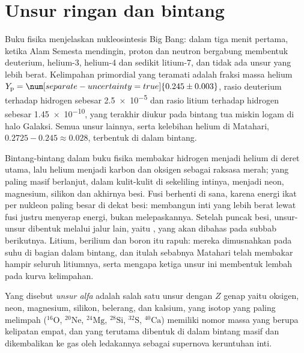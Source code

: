 \section{Unsur ringan dan bintang}\label{sec:b3:origin-of-elements:stars}

Buku fisika menjelaskan nukleosintesis Big Bang: dalam tiga menit pertama,
ketika Alam Semesta mendingin, proton dan neutron bergabung membentuk
deuterium, helium-3, helium-4 dan sedikit litium-7, dan tidak ada
unsur yang lebih berat. Kelimpahan primordial yang teramati adalah fraksi massa
helium $Y_\mathrm{p} = \num[separate-uncertainty=true]{0.245 \pm 0.003}$,
rasio deuterium terhadap hidrogen sebesar \num{2.5e-5} dan
rasio litium terhadap hidrogen sebesar \num{1.45e-10}, yang terakhir diukur pada bintang
tua miskin logam di halo Galaksi. Semua unsur lainnya, serta kelebihan helium
di Matahari, $0.2725 - 0.245 \approx 0.028$, terbentuk di dalam bintang.

Bintang-bintang dalam buku fisika membakar hidrogen menjadi helium di deret
utama, lalu helium menjadi karbon dan oksigen sebagai raksasa merah; yang
paling masif berlanjut, dalam kulit-kulit di sekeliling intinya, menjadi neon,
magnesium, silikon dan akhirnya besi. Fusi berhenti di sana, karena energi
ikat per nukleon paling besar di dekat besi: membangun inti yang lebih berat
lewat fusi justru menyerap energi, bukan melepaskannya. Setelah puncak besi,
unsur-unsur dibentuk melalui jalur lain, yaitu , yang
akan dibahas pada subbab berikutnya. Litium, berilium dan boron itu rapuh:
mereka dimusnahkan pada suhu di bagian dalam bintang, dan itulah sebabnya Matahari
telah membakar hampir seluruh litiumnya, serta mengapa ketiga unsur ini membentuk
lembah pada kurva kelimpahan.

\begin{definition}\label{def:b3:origin-of-elements:alpha}
Yang disebut \emph{unsur alfa} adalah salah satu unsur dengan $Z$ genap
yaitu oksigen, neon, magnesium, silikon, belerang, dan kalsium, yang
isotop yang paling melimpah ($^{16}\mathrm{O}$, $^{20}\mathrm{Ne}$,
$^{24}\mathrm{Mg}$, $^{28}\mathrm{Si}$, $^{32}\mathrm{S}$,
$^{40}\mathrm{Ca}$) memiliki nomor massa yang berupa kelipatan empat, dan
yang terutama dibentuk di dalam bintang masif dan dikembalikan ke gas oleh
ledakannya sebagai supernova keruntuhan inti.
\end{definition}

